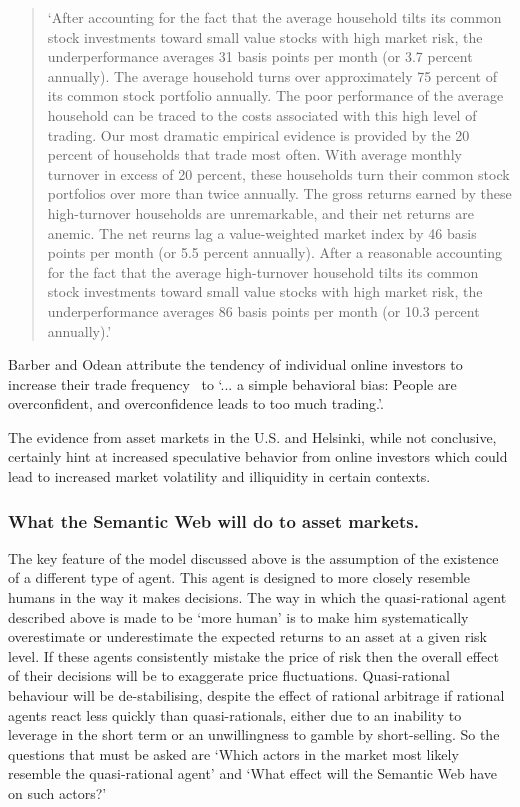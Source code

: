 \documentclass{ucthesis}
\begin{document}
\begin{quote}
`After accounting for the fact that the average household tilts its common
stock investments toward small value stocks with high market risk, the
underperformance averages 31 basis points per month (or 3.7 percent
annually). The average household turns over approximately 75 percent of its
common stock portfolio annually. The poor performance of the average
household can be traced to the costs associated with this high level of
trading. Our most dramatic empirical evidence is provided by the 20 percent
of households that trade most often. With average monthly turnover in excess
of 20 percent, these households turn their common stock portfolios over more
than twice annually. The gross returns earned by these high-turnover
households are unremarkable, and their net returns are anemic. The net
reurns lag a value-weighted market index by 46 basis points per month (or
5.5 percent annually). After a reasonable accounting for the fact that the
average high-turnover household tilts its common stock investments toward
small value stocks with high market risk, the underperformance averages 86
basis points per month (or 10.3 percent annually).' \cite[pp. 799-800]%
{Barber 2000}
\end{quote}

Barber and Odean attribute the tendency of individual online investors to
increase their trade frequency \ to `... a simple behavioral bias: People
are overconfident, and overconfidence leads to too much trading.'\cite[pp.
800]{Barber 2000}.

The evidence from asset markets in the U.S. and Helsinki, while not
conclusive, certainly hint at increased speculative behavior from online
investors which could lead to increased market volatility and illiquidity in
certain contexts.

\subsubsection{What the Semantic Web will do to asset markets.}

The key feature of the model discussed above is the assumption of the
existence of a different type of agent. This agent is designed to more
closely resemble humans in the way it makes decisions. The way in which the
quasi-rational agent described above is made to be `more human' is to make
him systematically overestimate or underestimate the expected returns to an
asset at a given risk level. If these agents consistently mistake the price
of risk then the overall effect of their decisions will be to exaggerate
price fluctuations. Quasi-rational behaviour will be de-stabilising, despite
the effect of rational arbitrage if rational agents react less quickly than
quasi-rationals, either due to an inability to leverage in the short term or
an unwillingness to gamble by short-selling. So the questions that must be
asked are `Which actors in the market most likely resemble the
quasi-rational agent' and `What effect will the Semantic Web have on such
actors?'
\end{document}
